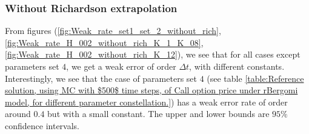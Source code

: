 \subsubsection{Without Richardson extrapolation}
From figures (\ref{fig:Weak_rate_set1_set_2_without_rich},\ref{fig:Weak_rate_H_002_without_rich_K_1_K_08},\ref{fig:Weak_rate_H_002_without_rich_K_12}), we see that for all cases  except parameters set $4$, we get a weak error of order $\Delta t$, with different  constants. Interestingly, we see that the case of parameters set $4$ (see table \ref{table:Reference solution, using MC with $500$ time steps, of Call option price under rBergomi model, for different parameter constellation.}) has a weak error rate of order around $0.4$ but with a small constant. The upper and lower bounds are $95\%$ confidence intervals.


